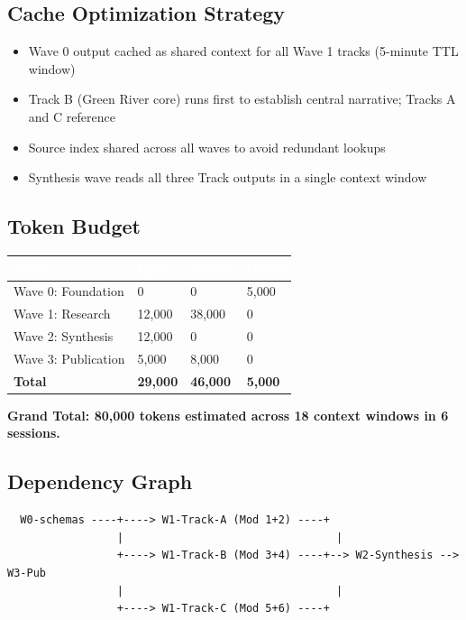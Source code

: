 \documentclass[11pt,letterpaper]{article}
\newcommand{\tableheader}[1]{\textbf{\sffamily\textcolor{white}{#1}}}
\begin{document}
\subsection{Cache Optimization Strategy}

\begin{itemize}[nosep]
  \item Wave 0 output cached as shared context for all Wave 1 tracks (5-minute TTL window)
  \item Track B (Green River core) runs first to establish central narrative; Tracks A and C reference
  \item Source index shared across all waves to avoid redundant lookups
  \item Synthesis wave reads all three Track outputs in a single context window
\end{itemize}

\subsection{Token Budget}

\begin{center}
\begin{tabularx}{\textwidth}{L{4cm}C{2cm}C{2cm}C{2cm}}
\toprule
{}
\tableheader{Wave} & \tableheader{Opus} & \tableheader{Sonnet} & \tableheader{Haiku} \\
\midrule
Wave 0: Foundation & 0 & 0 & 5,000 \\
Wave 1: Research & 12,000 & 38,000 & 0 \\
Wave 2: Synthesis & 12,000 & 0 & 0 \\
Wave 3: Publication & 5,000 & 8,000 & 0 \\
\midrule
\textbf{Total} & \textbf{29,000} & \textbf{46,000} & \textbf{5,000} \\
\bottomrule
\end{tabularx}
\end{center}

\textbf{Grand Total: 80,000 tokens estimated across 18 context windows in 6 sessions.}

\subsection{Dependency Graph}

\begin{asciibox}
\begin{verbatim}
  W0-schemas ----+----> W1-Track-A (Mod 1+2) ----+
                 |                                 |
                 +----> W1-Track-B (Mod 3+4) ----+--> W2-Synthesis --> W3-Pub
                 |                                 |
                 +----> W1-Track-C (Mod 5+6) ----+
\end{verbatim}
\end{asciibox}
\end{document}

